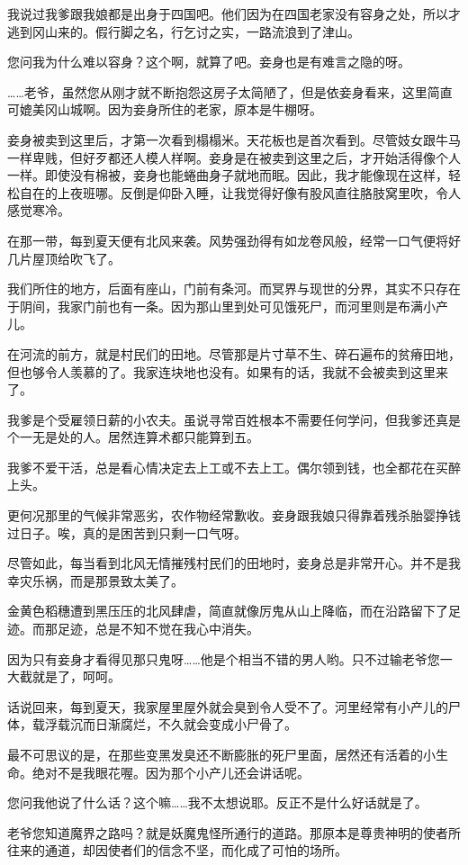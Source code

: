 \documentclass[portrait,a4paper]{article}
\begin{document}
我说过我爹跟我娘都是出身于四国吧。他们因为在四国老家没有容身之处，所以才逃到冈山来的。假行脚之名，行乞讨之实，一路流浪到了津山。

您问我为什么难以容身？这个啊，就算了吧。妾身也是有难言之隐的呀。

……老爷，虽然您从刚才就不断抱怨这房子太简陋了，但是依妾身看来，这里简直可媲美冈山城啊。因为妾身所住的老家，原本是牛棚呀。

妾身被卖到这里后，才第一次看到榻榻米。天花板也是首次看到。尽管妓女跟牛马一样卑贱，但好歹都还人模人样啊。妾身是在被卖到这里之后，才开始活得像个人一样。即使没有棉被，妾身也能蜷曲身子就地而眠。因此，我才能像现在这样，轻松自在的上夜班哪。反倒是仰卧入睡，让我觉得好像有股风直往胳肢窝里吹，令人感觉寒冷。

在那一带，每到夏天便有北风来袭。风势强劲得有如龙卷风般，经常一口气便将好几片屋顶给吹飞了。

我们所住的地方，后面有座山，门前有条河。而冥界与现世的分界，其实不只存在于阴间，我家门前也有一条。因为那山里到处可见饿死尸，而河里则是布满小产儿。

在河流的前方，就是村民们的田地。尽管那是片寸草不生、碎石遍布的贫瘠田地，但也够令人羡慕的了。我家连块地也没有。如果有的话，我就不会被卖到这里来了。

我爹是个受雇领日薪的小农夫。虽说寻常百姓根本不需要任何学问，但我爹还真是个一无是处的人。居然连算术都只能算到五。

我爹不爱干活，总是看心情决定去上工或不去上工。偶尔领到钱，也全都花在买醉上头。

更何况那里的气候非常恶劣，农作物经常歉收。妾身跟我娘只得靠着残杀胎婴挣钱过日子。唉，真的是困苦到只剩一口气呀。

尽管如此，每当看到北风无情摧残村民们的田地时，妾身总是非常开心。并不是我幸灾乐祸，而是那景致太美了。

金黄色稻穗遭到黑压压的北风肆虐，简直就像厉鬼从山上降临，而在沿路留下了足迹。而那足迹，总是不知不觉在我心中消失。

因为只有妾身才看得见那只鬼呀……他是个相当不错的男人哟。只不过输老爷您一大截就是了，呵呵。

话说回来，每到夏天，我家屋里屋外就会臭到令人受不了。河里经常有小产儿的尸体，载浮载沉而日渐腐烂，不久就会变成小尸骨了。

最不可思议的是，在那些变黑发臭还不断膨胀的死尸里面，居然还有活着的小生命。绝对不是我眼花喔。因为那个小产儿还会讲话呢。

您问我他说了什么话？这个嘛……我不太想说耶。反正不是什么好话就是了。

老爷您知道魔界之路吗？就是妖魔鬼怪所通行的道路。那原本是尊贵神明的使者所往来的通道，却因使者们的信念不坚，而化成了可怕的场所。
\end{document}
